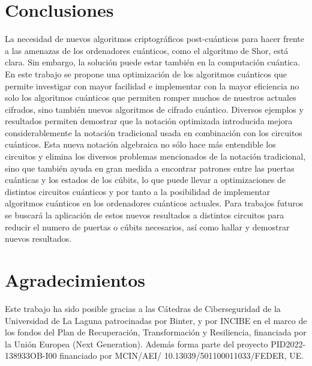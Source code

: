 \documentclass[10pt,conference,a4paper]{IEEEtran}
\begin{document}
\section{Conclusiones}
\label{seccion:6}
La necesidad de nuevos algoritmos criptográficos post-cuánticos para hacer frente a las amenazas de los ordenadores cuánticos, como el algoritmo de Shor, está clara. Sin embargo, la solución puede estar también en la computación cuántica. En este  trabajo se propone una optimización de los algoritmos cuánticos que permite investigar con mayor facilidad e implementar con la mayor eficiencia no solo los algoritmos cuánticos que permiten romper muchos de nuestros actuales cifrados, sino también nuevos algoritmos de cifrado cuántico. Diversos ejemplos y resultados permiten demostrar que la notación optimizada introducida mejora considerablemente la notación tradicional usada en combinación con los circuitos cuánticos. Esta nueva notación algebraica no sólo hace más entendible los circuitos y elimina los diversos problemas mencionados de la notación tradicional, sino que también ayuda en gran medida a encontrar patrones entre las puertas cuánticas y los estados de los cúbits, lo que puede llevar a optimizaciones de distintos circuitos cuánticos y por tanto a la posibilidad de implementar algoritmos cuánticos en los ordenadores cuánticos actuales. Para trabajos futuros se buscará la aplicación de estos nuevos resultados a distintos circuitos para reducir el numero de puertas o cúbits necesarios, así como hallar y demostrar nuevos resultados.

\section*{Agradecimientos}

Este trabajo ha sido posible gracias a las Cátedras  de Ciberseguridad de la Universidad de La Laguna patrocinadas por Binter, y por INCIBE en el marco de los fondos del Plan de Recuperación, Transformación y Resiliencia, financiada por la Unión Europea (Next Generation). Además forma parte del proyecto PID2022-138933OB-I00 financiado  por MCIN/AEI/ 10.13039/501100011033/FEDER, UE.\\




\end{document}
